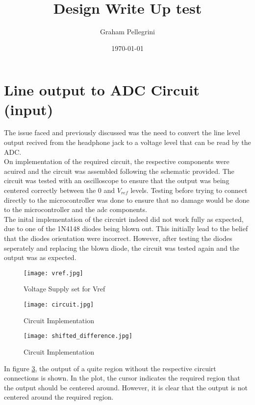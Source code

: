 \documentclass{article}
\title{Design Write Up test}
\author{Graham Pellegrini}
\date{\today}
\begin{document}
\maketitle
\section{Line output to ADC Circuit (input)}
The issue faced and previously discussed was the need to convert the line level output recived from the headphone jack to a voltage level that can be read by the ADC. \\

On implementation of the required circuit, the respective components were acuired and the circuit was assembled following the schematic provided. The circuit was tested with an oscilloscope to ensure that the output was being centered correctly between the 0 and $V_{ref}$ levels. Testing before trying to connect directly to the microcontroller was done to ensure that no damage would be done to the microcontroller and the adc components.\\

The inital implementation of the circuirt indeed did not work fully as expected, due to one of the 1N4148 diodes being blown out. This initially lead to the belief that the diodes orientation were incorrect. However, after testing the diodes seperately and replacing the blown diode, the circuit was tested again and the output was as expected. 

\begin{figure}[htpb]
    \centering
    \texttt{[image: vref.jpg]}
    \caption{Voltage Supply set for Vref}
    \label{fig1}
\end{figure}

\begin{figure}[htpb]
    \centering
    \texttt{[image: circuit.jpg]}
    \caption{Circuit Implementation}
    \label{fig2}
\end{figure}

\begin{figure}[htpb]
    \centering
    \texttt{[image: shifted\_difference.jpg]}
    \caption{Circuit Implementation}
    \label{fig3}
\end{figure}

In figure \ref{fig3}, the output of a quite region without the respective circuirt connections is shown. In the plot, the cursor indicates the required region that the output should be centered around. However, it is clear that the output is not centered around the required region.
\end{document}
